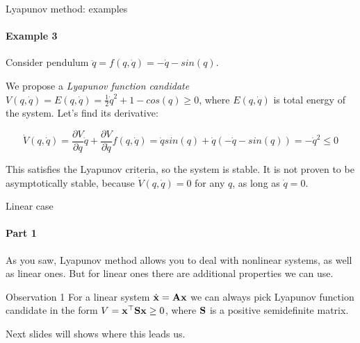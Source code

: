 \documentclass{beamer}
\begin{document}
\begin{frame}{Lyapunov method: examples}
\framesubtitle{Example 3}
\begin{flushleft}

Consider pendulum $\ddot{q} = f(q, \dot{q}) = -\dot{q} - sin(q)$. 

\bigskip

We propose a \emph{Lyapunov function candidate} $V(q, \dot{q}) = E(q, \dot{q}) = \frac{1}{2} \dot{q}^2 + 1 - cos(q)\geq 0$, where $E(q, \dot{q})$ is total energy of the system. Let's find its derivative:

\begin{equation}
    \dot V(q, \dot{q}) = 
    \frac{\partial V}{\partial q}       \dot{q} +
    \frac{\partial V}{\partial \dot{q}} f(q, \dot{q}) = 
    \dot{q} sin(q) + \dot{q}(-\dot{q} - sin(q)) =
    -\dot{q}^2 \leq 0
\end{equation}


This satisfies the Lyapunov criteria, so the system is stable. It is not proven to be asymptotically stable, because $\dot V(q, \dot{q}) = 0$ for any $q$, as long as $\dot{q} = 0$.

\end{flushleft}
\end{frame}


\begin{frame}{Linear case}
\framesubtitle{Part 1}
\begin{flushleft}

As you saw, Lyapunov method allows you to deal with nonlinear systems, as well as linear ones. But for linear ones there are additional properties we can use.

\begin{block}{Observation 1}
For a linear system $\dot{\mathbf{x}} = \mathbf{A}\mathbf{x}$ we can always pick Lyapunov function candidate in the form $V = \mathbf{x}^\top\mathbf{S}\mathbf{x} \geq 0$, where $\mathbf{S}$ is a positive semidefinite matrix.
\end{block}

\bigskip

Next slides will shows where this leads us.

\end{flushleft}
\end{frame}
\end{document}
